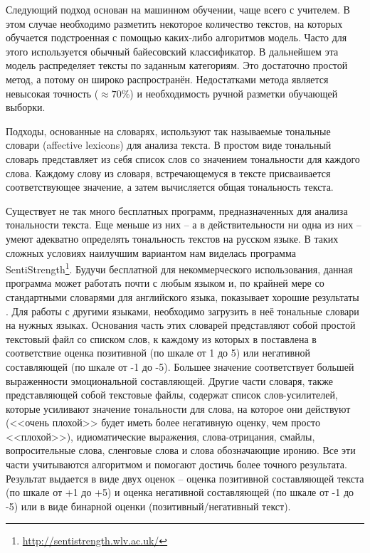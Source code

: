 Следующий подход основан на машинном обучении, чаще всего с учителем. В этом случае необходимо разметить некоторое количество текстов, на которых обучается подстроенная с помощью каких-либо алгоритмов модель. Часто для этого используется обычный байесовский классификатор. В дальнейшем эта модель распределяет тексты по заданным категориям. Это достаточно простой метод, а потому он широко распространён. Недостатками метода является невысокая точность ($\approx70$\%) и необходимость ручной разметки обучающей выборки.

Подходы, основанные на словарях, используют так называемые тональные словари (affective lexicons) для анализа текста. В простом виде тональный словарь представляет из себя список слов со значением тональности для каждого слова. Каждому слову из словаря, встречающемуся в тексте присваивается соответствующее значение, а затем вычисляется общая тональность текста.

Существует не так много бесплатных программ, предназначенных для анализа тональности текста. Еще меньше из них -- а в действительности ни одна из них -- умеют адекватно определять тональность текстов на русском языке. В таких сложных условиях наилучшим вариантом нам виделась программа SentiStrength\footnote{\href{http://sentistrength.wlv.ac.uk/}{http://sentistrength.wlv.ac.uk/}}. Будучи бесплатной для некоммерческого использования, данная программа может работать почти с любым языком и, по крайней мере со стандартными словарями для английского языка, показывает хорошие результаты \cite{SentiStrength}. Для работы с другими языками, необходимо загрузить в неё тональные словари на нужных языках. Основания часть этих словарей представляют собой простой текстовый файл со списком слов, к каждому из которых в поставлена в соответствие оценка позитивной (по шкале от 1 до 5) или негативной составляющей (по шкале от -1 до -5). Большее значение соответствует большей выраженности эмоциональной составляющей. Другие части словаря, также представляющей собой текстовые файлы, содержат список слов-усилителей, которые усиливают значение тональности для слова, на которое они действуют (<<очень плохой>> будет иметь более негативную оценку, чем просто <<плохой>>), идиоматические выражения, слова-отрицания, смайлы, вопросительные слова, сленговые слова и слова обозначающие иронию. Все эти части учитываются алгоритмом и помогают достичь более точного результата. Результат выдается в виде двух оценок – оценка позитивной составляющей текста (по шкале от +1 до +5) и оценка негативной составляющей (по шкале от -1 до -5) или в виде бинарной оценки (позитивный/негативный текст).

